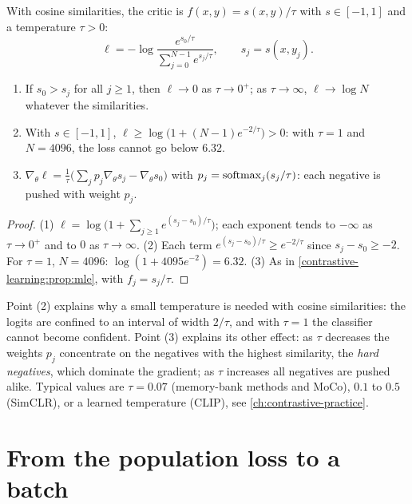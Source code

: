 \begin{notechapter}
With cosine similarities, the critic is $f(x, y) = s(x, y)/\tau$ with $s\in[-1, 1]$ and a temperature $\tau > 0$:
\[
  \ell = -\log\frac{e^{s_0/\tau}}{\sum_{j=0}^{N-1}e^{s_j/\tau}},\qquad s_j = s(x, y_j) .
\]

\begin{proposition}\label{contrastive-learning:prop:temperature}
\begin{enumerate}[nosep]
  \item If $s_0 > s_j$ for all $j\geq1$, then $\ell\to0$ as $\tau\to0^+$; as $\tau\to\infty$, $\ell\to\log N$ whatever the similarities.
  \item With $s\in[-1, 1]$, $\ell\geq\log\bigl(1 + (N - 1)e^{-2/\tau}\bigr) > 0$: with $\tau = 1$ and $N = 4096$, the loss cannot go below $6.32$.
  \item $\nabla_\theta\ell = \frac1\tau\bigl(\sum_jp_j\nabla_\theta s_j - \nabla_\theta s_0\bigr)$ with $p_j = \operatorname{softmax}_j(s_j/\tau)$: each negative is pushed with weight $p_j$.
\end{enumerate}
\end{proposition}

\begin{proof}
(1) $\ell = \log\bigl(1 + \sum_{j\geq1}e^{(s_j - s_0)/\tau}\bigr)$; each exponent tends to $-\infty$ as $\tau\to0^+$ and to $0$ as $\tau\to\infty$. (2) Each term
$e^{(s_j - s_0)/\tau}\geq e^{-2/\tau}$ since $s_j - s_0\geq-2$. For $\tau = 1$, $N = 4096$: $\log(1 + 4095e^{-2}) = 6.32$. (3) As in
\cref{contrastive-learning:prop:mle}, with $f_j = s_j/\tau$.
\end{proof}

Point (2) explains why a small temperature is needed with cosine similarities: the
logits are confined to an interval of width $2/\tau$, and with $\tau = 1$ the classifier cannot become confident.
Point (3) explains its other effect: as $\tau$ decreases the weights $p_j$ concentrate on the negatives with the
highest similarity, the \emph{hard negatives}, which dominate the gradient; as $\tau$ increases all negatives
are pushed alike. Typical values are $\tau = 0.07$ (memory-bank methods and MoCo), $0.1$ to $0.5$ (SimCLR), or a
learned temperature (CLIP), see \cref{ch:contrastive-practice}.

\section{From the population loss to a batch}\label{contrastive-learning:sec:batch}


\end{notechapter}
